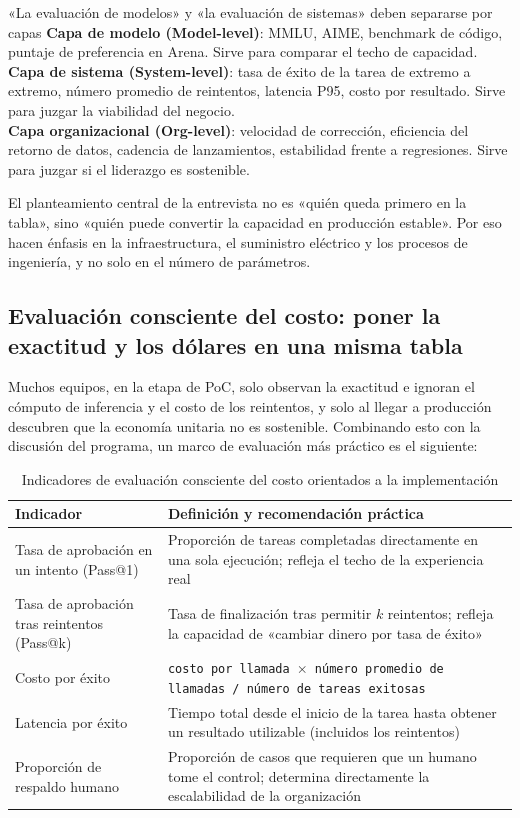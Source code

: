 \documentclass[a4paper]{article}
\begin{document}
\begin{knowledgebox}{«La evaluación de modelos» y «la evaluación de sistemas» deben separarse por capas}
\textbf{Capa de modelo (Model-level)}: MMLU, AIME, benchmark de código, puntaje de preferencia en Arena. Sirve para comparar el techo de capacidad.\\
\textbf{Capa de sistema (System-level)}: tasa de éxito de la tarea de extremo a extremo, número promedio de reintentos, latencia P95, costo por resultado. Sirve para juzgar la viabilidad del negocio.\\
\textbf{Capa organizacional (Org-level)}: velocidad de corrección, eficiencia del retorno de datos, cadencia de lanzamientos, estabilidad frente a regresiones. Sirve para juzgar si el liderazgo es sostenible.

El planteamiento central de la entrevista no es «quién queda primero en la tabla», sino «quién puede convertir la capacidad en producción estable». Por eso hacen énfasis en la infraestructura, el suministro eléctrico y los procesos de ingeniería, y no solo en el número de parámetros.
\end{knowledgebox}

\subsection{Evaluación consciente del costo: poner la exactitud y los dólares en una misma tabla}

Muchos equipos, en la etapa de PoC, solo observan la exactitud e ignoran el cómputo de inferencia y el costo de los reintentos, y solo al llegar a producción descubren que la economía unitaria no es sostenible. Combinando esto con la discusión del programa, un marco de evaluación más práctico es el siguiente:

\begin{table}[H]
\centering
\begin{tabular}{lp{9cm}}
\toprule
\textbf{Indicador} & \textbf{Definición y recomendación práctica} \\
\midrule
Tasa de aprobación en un intento (Pass@1) & Proporción de tareas completadas directamente en una sola ejecución; refleja el techo de la experiencia real \\
Tasa de aprobación tras reintentos (Pass@k) & Tasa de finalización tras permitir $k$ reintentos; refleja la capacidad de «cambiar dinero por tasa de éxito» \\
Costo por éxito & \texttt{costo por llamada $\times$ número promedio de llamadas / número de tareas exitosas} \\
Latencia por éxito & Tiempo total desde el inicio de la tarea hasta obtener un resultado utilizable (incluidos los reintentos) \\
Proporción de respaldo humano & Proporción de casos que requieren que un humano tome el control; determina directamente la escalabilidad de la organización \\
\bottomrule
\end{tabular}
\caption{Indicadores de evaluación consciente del costo orientados a la implementación}
\end{table}
\end{document}

